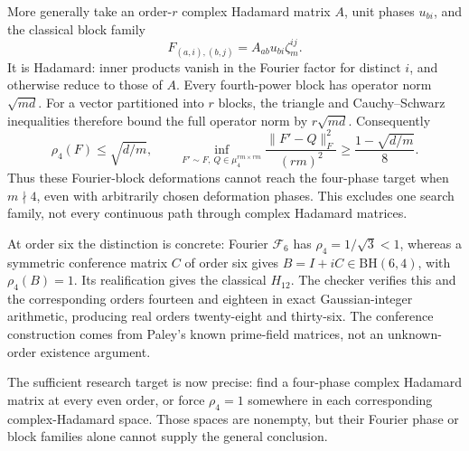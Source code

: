 \documentclass[11pt]{article}
\begin{document}
More generally take an order-$r$ complex Hadamard matrix $A$,
unit phases $u_{bi}$, and the classical block family
\[
 F_{(a,i),(b,j)}=A_{ab}u_{bi}\zeta_m^{ij}.
\]
It is Hadamard: inner products vanish in the Fourier factor for
distinct $i$, and otherwise reduce to those of $A$.
Every fourth-power block has operator norm $\sqrt{md}$.
For a vector partitioned into $r$ blocks, the triangle and
Cauchy--Schwarz inequalities therefore bound the full operator norm
by $r\sqrt{md}$. Consequently
\[
 \rho_4(F)\le\sqrt{d/m},\qquad
 \inf_{F'\sim F,\ Q\in\mu_4^{rm\times rm}}
 \frac{\|F'-Q\|_F^2}{(rm)^2}
 \ge\frac{1-\sqrt{d/m}}8.
\]
Thus these Fourier-block deformations cannot reach the four-phase
target when $m\nmid4$, even with arbitrarily chosen deformation phases.
This excludes one search family, not every continuous path through
complex Hadamard matrices.

At order six the distinction is concrete: Fourier $\mathcal F_6$
has $\rho_4=1/\sqrt3<1$, whereas a symmetric conference matrix $C$
of order six gives $B=I+iC\in\mathrm{BH}(6,4)$, with $\rho_4(B)=1$.
Its realification gives the classical $H_{12}$. The checker verifies
this and the corresponding orders fourteen and eighteen in exact
Gaussian-integer arithmetic, producing real orders twenty-eight
and thirty-six. The conference construction comes from Paley's
known prime-field matrices, not an unknown-order existence argument.

The sufficient research target is now precise: find a four-phase
complex Hadamard matrix at every even order, or force $\rho_4=1$
somewhere in each corresponding complex-Hadamard space.
Those spaces are nonempty, but their Fourier phase or block
families alone cannot supply the general conclusion.
\end{document}
